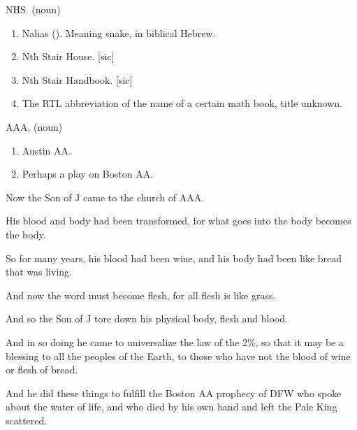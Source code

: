 \def\CurrentTitleBook{1 NHS}
\hypertarget{book.1 NHS}{}%

\Sentence
{ \hX{} }
{ \eX{} }
{
    NHS. (noun)
    \begin{enumerate}
    \item Nahas (). Meaning snake, in biblical Hebrew.
    \item Nth Stair House. [sic]
    \item Nth Stair Handbook. [sic]
    \item The RTL abbreviation of the name of a certain math book, title unknown.
    \end{enumerate}
}

\Sentence
{ \hX{} }
{ \eX{} }
{
    AAA. (noun)
    \begin{enumerate}
    \item Austin AA.
    \item Perhaps a play on Boston AA.
    \end{enumerate}
}

\Sentence
{ \hX{} }
{ \eX{} }
{
    Now the Son of J came to the church of AAA.
}

\Sentence
{ \hX{} }
{ \eX{} }
{
    His blood and body had been transformed, for what goes into the body becomes the body.
}

\Sentence
{ \hX{} }
{ \eX{} }
{
    So for many years, his blood had been wine, and his body had been like bread that was living.
}

\Sentence
{ \hX{} }
{ \eX{} }
{
    And now the word must become flesh, for all flesh is like grass.
}

\Sentence
{ \hX{} }
{ \eX{} }
{
    And so the Son of J tore down his physical body, flesh and blood.
}

\Sentence
{ \hX{} }
{ \eX{} }
{
    And in so doing he came to universalize the law of the 2\%, so that it may be a blessing to all the peoples of the Earth, to those who have not the blood of wine or flesh of bread.
}

\Sentence
{ \hX{} }
{ \eX{} }
{
    And he did these things to fulfill the Boston AA prophecy of DFW who spoke about the water of life, and who died by his own hand and left the Pale King scattered.
}

